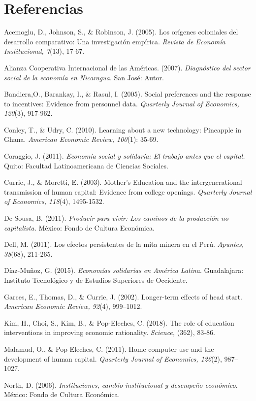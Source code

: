 \documentclass[12]{article}
\begin{document}
\section*{Referencias}
\begin{hangparas}{.25in}{1}
Acemoglu, D., Johnson, S., \& Robinson, J. (2005). Los orígenes coloniales del desarrollo comparativo: Una investigación empírica. \textit{Revista de Economía Institucional, 7}(13), 17-67.

Alianza Cooperativa Internacional de las Américas. (2007). \textit{ Diagnóstico del sector social de la economía en Nicaragua}. San José: Autor.  

Bandiera,O.,  Barankay, I., \& Rasul, I. (2005). Social preferences and the response to incentives: Evidence from personnel data. \textit{Quarterly Journal of Economics, 120}(3), 917-962. 

Conley, T., \& Udry, C. (2010). Learning about a new technology: Pineapple in Ghana. \textit{American Economic Review, 100}(1): 35-69. 

Coraggio, J. (2011). \textit{Economía social y solidaria: El trabajo antes que el capital.} Quito: Facultad Latinoamericana de Ciencias Sociales.  

Currie, J., \& Moretti, E. (2003). Mother’s Education and the intergenerational transmission of human capital: Evidence from college openings. \textit{Quarterly Journal of Economics, 118}(4), 1495-1532. 

De Sousa, B. (2011). \textit{Producir para vivir: Los caminos de la producción no capitalista.} México: Fondo de Cultura Económica.  

Dell, M. (2011). Los efectos persistentes de la mita minera en el Perú. \textit{Apuntes, 38}(68), 211-265. 

Díaz-Muñoz, G. (2015). \textit{Economías solidarias en América Latina}. Guadalajara: Instituto Tecnológico y de Estudios Superiores de Occidente.  

Garces, E., Thomas, D., \& Currie, J. (2002). Longer-term effects of head start. \textit{American Economic Review, 92}(4), 999–1012. 

Kim, H., Choi, S., Kim, B., \& Pop-Eleches, C. (2018). The role of education interventions in improving economic rationality. \textit{Science,} (362), 83-86. 

Malamud, O., \& Pop-Eleches, C. (2011). Home computer use and the development of human capital. \textit{Quarterly Journal of Economics, 126}(2), 987–1027. 

North, D. (2006). \textit{Instituciones, cambio institucional y desempeño económico}. México: Fondo de Cultura Económica. 


\end{hangparas}
\end{document}
